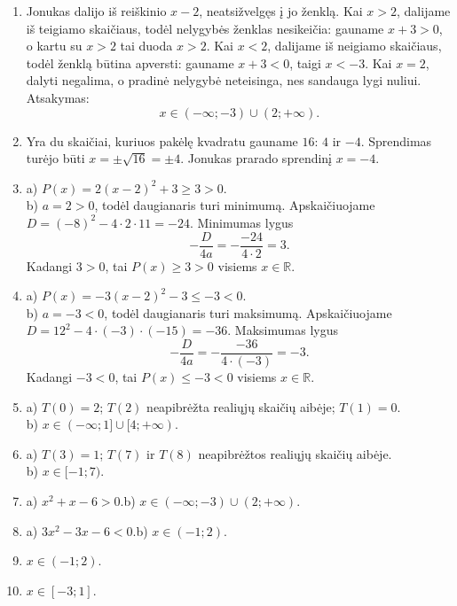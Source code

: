 \documentclass[11pt,a4paper]{article}
\begin{document}
\begin{enumerate}[label=\textbf{\arabic*.},leftmargin=2.6em,itemsep=0.85em,topsep=0.55em]
\item Jonukas dalijo iš reiškinio $x-2$, neatsižvelgęs į jo ženklą. Kai $x>2$, dalijame iš teigiamo skaičiaus, todėl nelygybės ženklas nesikeičia: gauname $x+3>0$, o kartu su $x>2$ tai duoda $x>2$. Kai $x<2$, dalijame iš neigiamo skaičiaus, todėl ženklą būtina apversti: gauname $x+3<0$, taigi $x<-3$. Kai $x=2$, dalyti negalima, o pradinė nelygybė neteisinga, nes sandauga lygi nuliui. Atsakymas:
  \[
    x\in(-\infty;-3)\cup(2;+\infty).
  \]

\item Yra du skaičiai, kuriuos pakėlę kvadratu gauname $16$: $4$ ir $-4$. Sprendimas turėjo būti $x=\pm\sqrt{16}=\pm4$. Jonukas prarado sprendinį $x=-4$.

\item a) $P(x)=2(x-2)^2+3\ge 3>0$.\\
      b) $a=2>0$, todėl daugianaris turi minimumą. Apskaičiuojame $D=(-8)^2-4\cdot2\cdot11=-24$. Minimumas lygus
      \[
        -\frac{D}{4a}=-\frac{-24}{4\cdot2}=3.
      \]
      Kadangi $3>0$, tai $P(x)\geq 3>0$ visiems $x\in\mathbb{R}$.

\item a) $P(x)=-3(x-2)^2-3\le -3<0$.\\
      b) $a=-3<0$, todėl daugianaris turi maksimumą. Apskaičiuojame $D=12^2-4\cdot(-3)\cdot(-15)=-36$. Maksimumas lygus
      \[
        -\frac{D}{4a}=-\frac{-36}{4\cdot(-3)}=-3.
      \]
      Kadangi $-3<0$, tai $P(x)\leq -3<0$ visiems $x\in\mathbb{R}$.

\item a) $T(0)=2$; $T(2)$ neapibrėžta realiųjų skaičių aibėje; $T(1)=0$.\\
      b) $x\in(-\infty;1]\cup[4;+\infty)$.

\item a) $T(3)=1$; $T(7)$ ir $T(8)$ neapibrėžtos realiųjų skaičių aibėje.\\
      b) $x\in[-1;7)$.

\item a) $x^2+x-6>0$.\quad b) $x\in(-\infty;-3)\cup(2;+\infty)$.

\item a) $3x^2-3x-6<0$.\quad b) $x\in(-1;2)$.

\item $x\in(-1;2)$.

\item $x\in[-3;1]$.


\end{enumerate}
\end{document}
